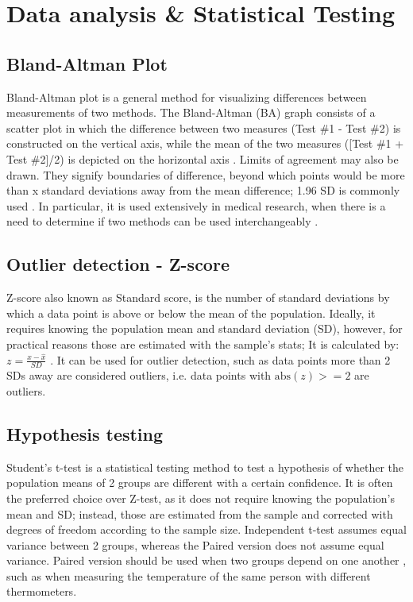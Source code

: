 \section{Data analysis \& Statistical Testing}
\subsection{Bland-Altman Plot}
Bland-Altman plot is a general method for visualizing differences between measurements of two methods. The Bland-Altman (BA) graph consists of a scatter plot in which the difference between two measures (Test \#1 - Test \#2) is constructed on the vertical axis, while the mean of the two measures ([Test \#1 + Test \#2]/2) is depicted on the horizontal axis \cite{kaur2017bland}. Limits of agreement may also be drawn. They signify boundaries of difference, beyond which points would be more than x standard deviations away from the mean difference; 1.96 SD is commonly used \cite{myles2007using}.  In particular, it is used extensively in medical research, when there is a need to determine if two methods can be used interchangeably \cite{myles2007using}.
\subsection{Outlier detection - Z-score}
Z-score also known as Standard score, is the number of standard deviations by which a data point is above or below the mean of the population. Ideally, it requires knowing the population mean and standard deviation (SD), however, for practical reasons those are estimated with the sample's stats; It is calculated by: $z=\frac{x-\hat{x}}{SD}$ \cite{zscoreBook}. It can be used for outlier detection, such as data points more than 2 SDs away are considered outliers, i.e. data points with $\text{abs}(z) >= 2$ are outliers.
\subsection{Hypothesis testing}
Student's t-test is a statistical testing method to test a hypothesis of whether the population means of 2 groups are different with a certain confidence. It is often the preferred choice over Z-test, as it does not require knowing the population's mean and SD; instead, those are estimated from the sample and corrected with degrees of freedom according to the sample size. Independent t-test assumes equal variance between 2 groups, whereas the Paired version does not assume equal variance. Paired version should be used when two groups depend on one another \cite{LIVINGSTON200458}, such as when measuring the temperature of the same person with different thermometers.

